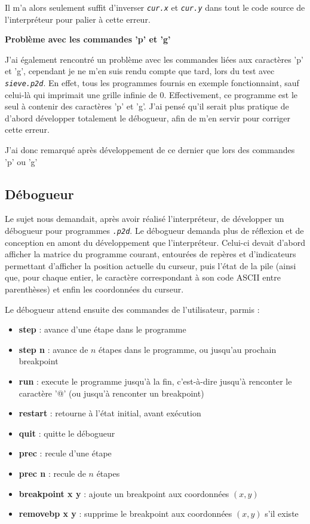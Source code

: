 \documentclass[a4paper,11pt]{article}
\newcommand{\code}[1]{{\itshape\lstinline{#1}}}
\begin{document}
Il m'a alors seulement suffit d'inverser \code{cur.x} et \code{cur.y} dans tout le code source de l'interpréteur pour palier à cette erreur.

\bigskip

{\small\textbf{Problème avec les commandes 'p' et 'g'}}

J'ai également rencontré un problème avec les commandes liées aux caractères 'p' et 'g', cependant je ne m'en suis rendu compte que tard, lors du test avec \code{sieve.p2d}. En effet, tous les programmes fournis en exemple fonctionnaint, sauf celui-là qui imprimait une grille infinie de 0. Effectivement, ce programme est le seul à contenir des caractères 'p' et 'g'. J'ai pensé qu'il serait plus pratique de d'abord développer totalement le débogueur, afin de m'en servir pour corriger cette erreur.

J'ai donc remarqué après développement de ce dernier que lors des commandes 'p' ou 'g'



\subsection*{Débogueur}

Le sujet nous demandait, après avoir réalisé l'interpréteur, de développer un débogueur pour programmes \code{.p2d}. Le débogueur demanda plus de réflexion et de conception en amont du développement que l'interpréteur. Celui-ci devait d'abord afficher la matrice du programme courant, entourées de repères et d'indicateurs permettant d'afficher la position actuelle du curseur, puis l'état de la pile (ainsi que, pour chaque entier, le caractère correspondant à son code ASCII entre parenthèses) et enfin les coordonnées du curseur.

Le débogueur attend ensuite des commandes de l'utilisateur, parmis :
\renewcommand{\labelitemi}{\textbullet}
\begin{itemize}
    \item \textbf{step} : avance d'une étape dans le programme
    \item \textbf{step n} : avance de $n$ étapes dans le programme, ou jusqu'au prochain breakpoint
    \item \textbf{run} : execute le programme jusqu'à la fin, c'est-à-dire jusqu'à renconter le caractère '@' (ou jusqu'à renconter un breakpoint)
    \item \textbf{restart} : retourne à l'état initial, avant exécution
    \item \textbf{quit} : quitte le débogueur
    \item \textbf{prec} : recule d'une étape
    \item \textbf{prec n} : recule de $n$ étapes
    \item \textbf{breakpoint x y} : ajoute un breakpoint aux coordonnées $(x, y)$
    \item \textbf{removebp x y} : supprime le breakpoint aux coordonnées $(x, y)$ s'il existe
\end{itemize}
\end{document}
